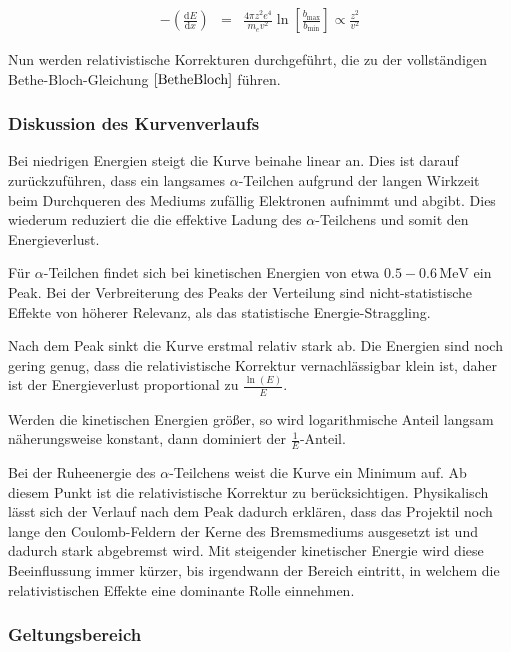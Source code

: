 \documentclass[12pt,a4paper]{scrartcl}
\numberwithin{equation}{section} %
\renewcommand{\[}{} %
\renewcommand{\]}{\noindent} %
\begin{document}
\[
\begin{eqnarray}
    -\left(\frac{\mathrm dE}{\mathrm dx}\right)
        &=& \frac{4\pi z^2 e^4}{m_ev^2}
            \ln\left[\frac{b_\mathrm{max}}{b_\mathrm{min}}\right]
            \propto \frac{z^2}{v^2}
\end{eqnarray}
\]

Nun werden relativistische Korrekturen durchgeführt, die zu der
vollständigen Bethe-Bloch-Gleichung \(\eqref{BetheBloch}\) führen.

\hypertarget{diskussion-des-kurvenverlaufs}{%
\subsubsection{Diskussion des
Kurvenverlaufs}\label{diskussion-des-kurvenverlaufs}}

Bei niedrigen Energien steigt die Kurve beinahe linear an. Dies ist
darauf zurückzuführen, dass ein langsames \(\alpha\)-Teilchen aufgrund
der langen Wirkzeit beim Durchqueren des Mediums zufällig Elektronen
aufnimmt und abgibt. Dies wiederum reduziert die die effektive Ladung
des \(\alpha\)-Teilchens und somit den Energieverlust.

Für \(\alpha\)-Teilchen findet sich bei kinetischen Energien von etwa
\(0.5-0.6\mathrm{\,MeV}\) ein Peak. Bei der Verbreiterung des Peaks der
Verteilung sind nicht-statistische Effekte von höherer Relevanz, als das
statistische Energie-Straggling.

Nach dem Peak sinkt die Kurve erstmal relativ stark ab. Die Energien
sind noch gering genug, dass die relativistische Korrektur
vernachlässigbar klein ist, daher ist der Energieverlust proportional zu
\(\frac{\ln(E)}{E}\).

Werden die kinetischen Energien größer, so wird logarithmische Anteil
langsam näherungsweise konstant, dann dominiert der
\(\frac{1}{E}\)-Anteil.

Bei der Ruheenergie des \(\alpha\)-Teilchens weist die Kurve ein Minimum
auf. Ab diesem Punkt ist die relativistische Korrektur zu
berücksichtigen. Physikalisch lässt sich der Verlauf nach dem Peak
dadurch erklären, dass das Projektil noch lange den Coulomb-Feldern der
Kerne des Bremsmediums ausgesetzt ist und dadurch stark abgebremst wird.
Mit steigender kinetischer Energie wird diese Beeinflussung immer
kürzer, bis irgendwann der Bereich eintritt, in welchem die
relativistischen Effekte eine dominante Rolle einnehmen.

\hypertarget{geltungsbereich}{%
\subsubsection{Geltungsbereich}\label{geltungsbereich}}
\end{document}
